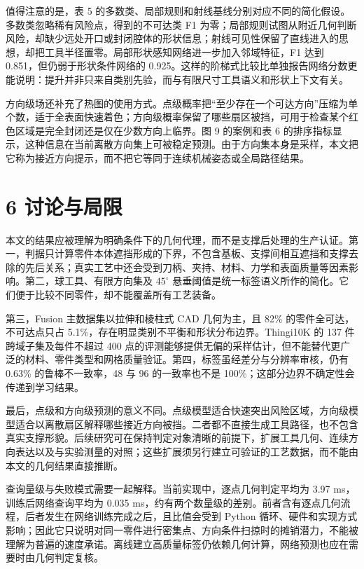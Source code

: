 值得注意的是，表 5 的多数类、局部规则和射线基线分别对应不同的简化假设。多数类忽略稀有风险点，得到的不可达类 F1 为零；局部规则试图从附近几何判断风险，却缺少远处开口或封闭腔体的形状信息；射线可见性保留了直线进入的思想，却把工具半径置零。局部形状感知网络进一步加入邻域特征，F1 达到 0.851，但仍弱于形状条件网络的 0.925。这样的阶梯式比较比单独报告网络分数更能说明：提升并非只来自类别先验，而与有限尺寸工具语义和形状上下文有关。

方向级场还补充了热图的使用方式。点级概率把``至少存在一个可达方向''压缩为单个数，适于全表面快速着色；方向级概率保留了哪些扇区被挡，可用于检查某个红色区域是完全封闭还是仅在少数方向上临界。图 9 的案例和表 6 的排序指标显示，这种信息在当前离散方向集上可被稳定预测。由于方向集本身是采样，本文把它称为接近方向提示，而不把它等同于连续机械姿态或全局路径结果。

\section{6 讨论与局限}\label{ux8ba8ux8bbaux4e0eux5c40ux9650}

本文的结果应被理解为明确条件下的几何代理，而不是支撑后处理的生产认证。第一，判据只计算零件本体遮挡形成的下界，不包含基板、支撑间相互遮挡和支撑去除的先后关系；真实工艺中还会受到刀柄、夹持、材料、力学和表面质量等因素影响。第二，球工具、有限方向集及 \(45^\circ\) 悬垂阈值是统一标签语义所作的简化。它们便于比较不同零件，却不能覆盖所有工艺装备。

第三，Fusion 主数据集以拉伸和棱柱式 CAD 几何为主，且 82\% 的零件全可达，不可达点只占 5.1\%，存在明显类别不平衡和形状分布边界。Thingi10K 的 137 件跨域子集及每件不超过 400 点的评测能够提供无偏的采样估计，但不能替代更广泛的材料、零件类型和网格质量验证。第四，标签虽经差分与分辨率审核，仍有 0.63\% 的鲁棒不一致率，48 与 96 的一致率也不是 100\%；这部分边界不确定性会传递到学习结果。

最后，点级和方向级预测的意义不同。点级模型适合快速突出风险区域，方向级模型适合以离散扇区解释哪些接近方向被挡。二者都不直接生成工具路径，也不包含真实支撑形貌。后续研究可在保持判定对象清晰的前提下，扩展工具几何、连续方向表达以及与实验测量的对照；这些扩展须另行建立可验证的工艺数据，而不能由本文的几何结果直接推断。

查询量级与失败模式需要一起解释。当前实现中，逐点几何判定平均为 3.97 ms，训练后网络查询平均为 0.035 ms，约有两个数量级的差别。前者含有逐点几何流程，后者发生在网络训练完成之后，且比值会受到 Python 循环、硬件和实现方式影响；因此它只说明对同一零件进行密集点、方向条件扫掠时的摊销潜力，不能被理解为普遍的速度承诺。离线建立高质量标签仍依赖几何计算，网络预测也应在需要时由几何判定复核。

